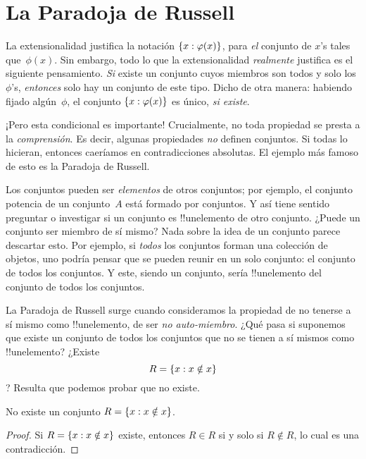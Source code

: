 \documentclass[../../../include/open-logic-section]{subfiles}
\begin{document}
\section{La Paradoja de Russell}

La extensionalidad justifica la notación $\{ x : \varphi(x) \}$, para \emph{el} conjunto de $x$'s tales que~$\phi(x)$. Sin embargo, todo lo que la extensionalidad \emph{realmente} justifica es el siguiente pensamiento. \emph{Si} existe un conjunto cuyos miembros son todos y solo los $\phi$'s, \emph{entonces} solo hay un conjunto de este tipo. Dicho de otra manera: habiendo fijado algún~$\phi$, el conjunto $\{ x : \varphi(x) \}$ es único, \emph{si existe}.

¡Pero esta condicional es importante!{} Crucialmente, no toda propiedad se presta a la \emph{comprensión}. Es decir, algunas propiedades \emph{no} definen conjuntos. Si todas lo hicieran, entonces caeríamos en contradicciones absolutas. El ejemplo más famoso de esto es la Paradoja de Russell.

Los conjuntos pueden ser \emph{elementos} de otros conjuntos; por ejemplo, el conjunto potencia de un conjunto~$A$ está formado por conjuntos. Y así tiene sentido preguntar o investigar si un conjunto es !!un{elemento} de otro conjunto. ¿Puede un conjunto ser miembro de sí mismo? Nada sobre la idea de un conjunto parece descartar esto. Por ejemplo, si \emph{todos} los conjuntos forman una colección de objetos, uno podría pensar que se pueden reunir en un solo conjunto: el conjunto de todos los conjuntos. Y este, siendo un conjunto, sería !!un{elemento} del conjunto de todos los conjuntos.

La Paradoja de Russell surge cuando consideramos la propiedad de no tenerse
a sí mismo como !!un{elemento}, de ser \emph{no auto-miembro}. ¿Qué pasa si
suponemos que existe un conjunto de todos los conjuntos que no se tienen a sí mismos
como !!un{elemento}? ¿Existe
\[
R = \{ x : x \notin x \}
\]?
Resulta que podemos probar que no existe.

\begin{thm}\label{thm:russells-paradox}
	No existe un conjunto $R = \{ x : x \notin x \}$.
\end{thm}

\begin{proof}
Si $R = \{ x : x \notin x \}$ existe, entonces
$R \in R$ si y solo si $R \notin R$, lo cual es una contradicción.
\end{proof}
\end{document}
